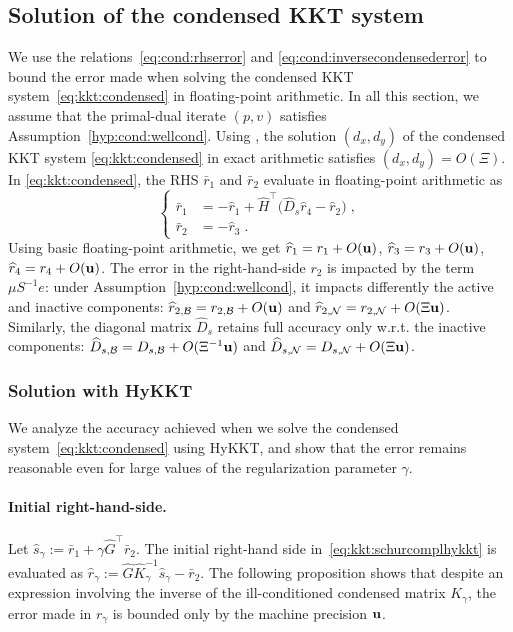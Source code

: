 \subsection{Solution of the condensed KKT system}
We use the relations~\eqref{eq:cond:rhserror} and \eqref{eq:cond:inversecondensederror}
to bound the error made when solving the condensed KKT system~\eqref{eq:kkt:condensed}
in floating-point arithmetic.
In all this section, we assume that
the primal-dual iterate $(p,v)$ satisfies Assumption~\ref{hyp:cond:wellcond}.
Using \cite[Corollary 3.3]{wright2001effects}, the solution $(d_x, d_y)$ of the
condensed KKT system \eqref{eq:kkt:condensed} in exact arithmetic satisfies
$(d_x, d_y) = O(\Xi)$.
In \eqref{eq:kkt:condensed}, the RHS $\bar{r}_1$ and $\bar{r}_2$
evaluate in floating-point arithmetic as
\begin{equation}
  \label{eq:cond:condensedrhs}
  \left\{
  \begin{aligned}
    \bar{r}_1 &= - \widehat{r}_1 + \widehat{H}^\top\big(\widehat{D}_{s} \widehat{r}_{4} - \widehat{r}_{2} \big) \;, \\
     \bar{r}_2 &= -\widehat{r}_3 \; .
  \end{aligned}
  \right.
\end{equation}
Using basic floating-point arithmetic, we get
$\widehat{r}_1 = r_1 + O(\mathbf{u})$,
$\widehat{r}_3 = r_3 + O(\mathbf{u})$,
$\widehat{r}_4 = r_4 + O(\mathbf{u})$.
The error in the right-hand-side $r_2$ is impacted by the term $\mu S^{-1}e$:
under Assumption~\ref{hyp:cond:wellcond}, it impacts differently
the active and inactive components:
$\widehat{r}_{2,\mathcal{B}}= r_{2,\mathcal{B}} + O(\mathbf{u})$ and
$\widehat{r}_{2,\mathcal{N}}= r_{2,\mathcal{N}} + O(\Xi \mathbf{u})$.
Similarly, the diagonal matrix $\widehat{D}_s$ retains full accuracy only
w.r.t. the inactive components: $\widehat{D}_{s,\mathcal{B}} = D_{s,\mathcal{B}} + O(\Xi^{-1} \mathbf{u})$
and $\widehat{D}_{s,\mathcal{N}} = D_{s,\mathcal{N}} + O(\Xi \mathbf{u})$.

\subsubsection{Solution with HyKKT}
We analyze the accuracy achieved when we solve the condensed system~\eqref{eq:kkt:condensed}
using HyKKT,
and show that the error remains reasonable even for large values of
the regularization parameter $\gamma$.

\paragraph{Initial right-hand-side.}
Let $\widehat{s}_\gamma := \bar{r}_1 + \gamma \widehat{G}^\top \bar{r}_2$.
The initial right-hand side in~\eqref{eq:kkt:schurcomplhykkt}
is evaluated as
$\widehat{r}_\gamma :=\widehat{G} \widehat{K}_\gamma^{-1} \widehat{s}_\gamma - \bar{r}_2$.
The following proposition shows that despite an expression involving the inverse
of the ill-conditioned condensed matrix $K_\gamma$, the error made in $r_\gamma$
is bounded only by the machine precision $\mathbf{u}$.

